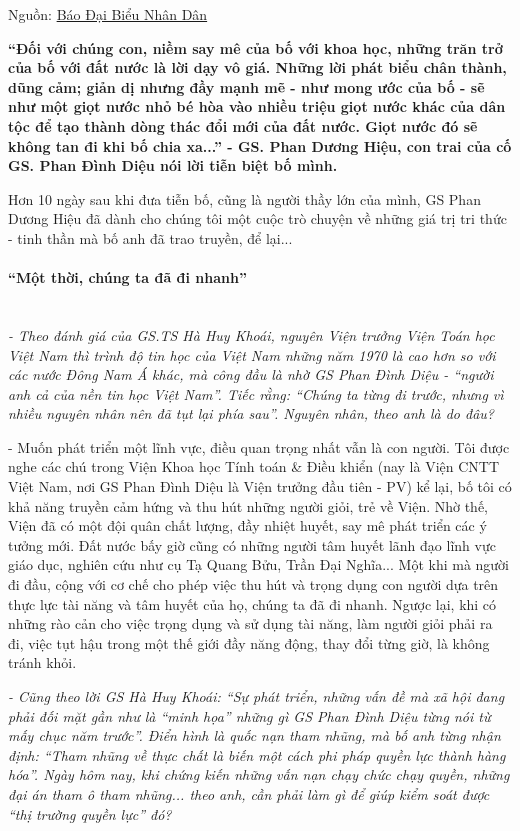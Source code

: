 
Nguồn: 
\href{https://daibieunhandan.vn/giot-nuoc-do-se-khong-tan-di-406217}{Báo Đại Biểu Nhân Dân}


\textbf{“Đối với chúng con, niềm say mê của bố với khoa học, những trăn trở của bố với đất nước là lời dạy vô giá. Những lời phát biểu chân thành, dũng cảm; giản dị nhưng đầy mạnh mẽ - như mong ước của bố - sẽ như một giọt nước nhỏ bé hòa vào nhiều triệu giọt nước khác của dân tộc để tạo thành dòng thác đổi mới của đất nước. Giọt nước đó sẽ không tan đi khi bố chia xa...” - GS. Phan Dương Hiệu, con trai của cố GS. Phan Đình Diệu nói lời tiễn biệt bố mình.}


Hơn 10 ngày sau khi đưa tiễn bố, cũng là người thầy lớn của mình, GS Phan Dương Hiệu đã dành cho chúng tôi một cuộc trò chuyện về những giá trị tri thức - tinh thần mà bố anh đã trao truyền, để lại...

\paragraph{“Một thời, chúng ta đã đi nhanh”} \ \\
\textit{- Theo đánh giá của GS.TS Hà Huy Khoái, nguyên Viện trưởng Viện Toán học Việt Nam thì trình độ tin học của Việt Nam những năm 1970 là cao hơn so với các nước Đông Nam Á khác, mà công đầu là nhờ GS Phan Đình Diệu - “người anh cả của nền tin học Việt Nam”. Tiếc rằng: “Chúng ta từng đi trước, nhưng vì nhiều nguyên nhân nên đã tụt lại phía sau”. Nguyên nhân, theo anh là do đâu?}

- Muốn phát triển một lĩnh vực, điều quan trọng nhất vẫn là con người. Tôi được nghe các chú trong Viện Khoa học Tính toán \& Điều khiển (nay là Viện CNTT Việt Nam, nơi GS Phan Đình Diệu là Viện trưởng đầu tiên - PV) kể lại, bố tôi có khả năng truyền cảm hứng và thu hút những người giỏi, trẻ về Viện. Nhờ thế, Viện đã có một đội quân chất lượng, đầy nhiệt huyết, say mê phát triển các ý tưởng mới. Đất nước bấy giờ cũng có những người tâm huyết lãnh đạo lĩnh vực giáo dục, nghiên cứu như cụ Tạ Quang Bửu, Trần Đại Nghĩa... Một khi mà người đi đầu, cộng với cơ chế cho phép việc thu hút và trọng dụng con người dựa trên thực lực tài năng và tâm huyết của họ, chúng ta đã đi nhanh. Ngược lại, khi có những rào cản cho việc trọng dụng và sử dụng tài năng, làm người giỏi phải ra đi, việc tụt hậu trong một thế giới đầy năng động, thay đổi từng giờ, là không tránh khỏi.

\textit{- Cũng theo lời GS Hà Huy Khoái: “Sự phát triển, những vấn đề mà xã hội đang phải đối mặt gần như là “minh họa” những gì GS Phan Đình Diệu từng nói từ mấy chục năm trước”. Điển hình là quốc nạn tham nhũng, mà bố anh từng nhận định: “Tham nhũng về thực chất là biến một cách phi pháp quyền lực thành hàng hóa”. Ngày hôm nay, khi chứng kiến những vấn nạn chạy chức chạy quyền, những đại án tham ô tham nhũng... theo anh, cần phải làm gì để giúp kiểm soát được “thị trường quyền lực” đó?}

